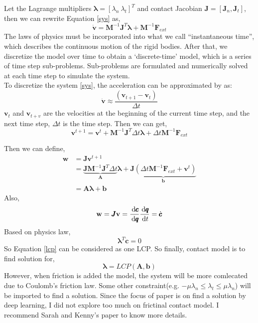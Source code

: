     Let the Lagrange multipliers $\pmb{\lambda} = [\lambda_n~\lambda_t]^{T}$ and contact Jacobian $\pmb{J} = [\pmb{J}_n, \pmb{J}_{t}]$, then we can rewrite Equation \ref{sys} as, 
    \begin{equation}
        \dot{\mathbf{v}} = \pmb{M}^{-1}\pmb{J}^{T}\pmb{\lambda} + \pmb{M}^{-1}\mathbf{F}_{ext}
    \end{equation}
    The laws of physics must be incorporated into what we call ``instantaneous time'', which describes the continuous motion of the rigid bodies. After that, we discretize the model over time to obtain a `discrete-time' model, which is a series of time step sub-problems. Sub-problems are formulated and numerically solved at each time step to simulate the system.\\
    
    To discretize the system \ref{sys}, the acceleration can be approximated by \cite{anitescu1997modeling} as:
    \begin{equation}
        \dot{\mathbf{v}} \approx \frac{(\mathbf{v}_{t+1} - \mathbf{v}_t)}{\Delta t}
    \end{equation}
    $\mathbf{v}_t$ and $\mathbf{v}_{t+v}$ are the velocities at the beginning of the current time step, and the next time step, $\Delta t$ is the time step. Then we can get,
    \begin{equation}
        \mathbf{v}^{t+1} = \mathbf{v}^{t} + \pmb{M}^{-1}\pmb{J}^{T}\Delta{t}\pmb{\lambda} + \Delta{t}\pmb{M}^{-1}\mathbf{F}_{ext}
    \end{equation}

    Then we can define,
    \begin{equation}
    \begin{aligned}
        \mathbf{w} & = \pmb{J}\mathbf{v}^{t+1} \\
        & =  \underbrace{\pmb{J}\pmb{M}^{-1}\pmb{J}^{T}\Delta{t}}_{\pmb{A}}\pmb{\lambda} + \underbrace{\pmb{J}(\Delta{t}\pmb{M}^{-1}\mathbf{F}_{ext} + \mathbf{v}^{t})}_{\pmb{b}} \\
        & = \pmb{A}\pmb{\lambda} + \pmb{b}
        \label{lcp}
    \end{aligned} 
    \end{equation}
    Also,
    \begin{equation}
        \mathbf{w} = \pmb{J}\mathbf{v} = \frac{\,\mathrm{d}{\pmb{c}}}{\,\mathrm{d}{\pmb{q}}}\frac{\,\mathrm{d}{\pmb{q}}}{\,\mathrm{d}{t}} = \dot{\pmb{c}}
    \end{equation}
    Based on physics law,
    $$\pmb{\lambda}^{T} \dot{\pmb{c}} = 0$$
    So Equation \ref{lcp} can be considered as one LCP. So finally, contact model is to find solution for,
    $$\pmb{\lambda} = \textit{LCP}(\pmb{A}, \pmb{b})$$
    However, when friction is added the model, the system will be more comlecated due to Coulomb’s friction law. Some other constraint(e.g. $-\mu \lambda_{n} \le \lambda_t \le \mu \lambda_n$) will be imported to find a solution. Since the focus of paper is on find a solution by deep learning, I did not explore too much on frictinal contact model. I recommend Sarah and Kenny's paper \cite{poulsen2010heuristic} to know more details. 

